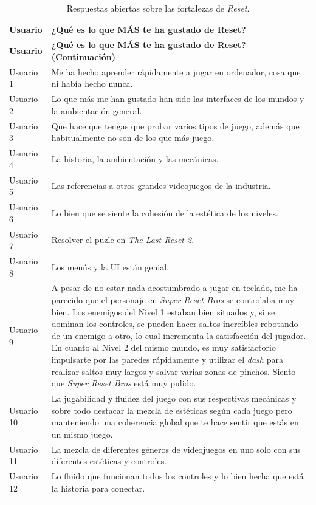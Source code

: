 \begin{longtable}{|l|p{12.5cm}|}
\hline
\textbf{Usuario} & \textbf{¿Qué es lo que MÁS te ha gustado de Reset?} \\ \hline
\endfirsthead
\hline
\textbf{Usuario} & \textbf{¿Qué es lo que MÁS te ha gustado de Reset? (Continuación)} \\ \hline
\endhead
\hline
\endfoot
\hline
\endlastfoot
Usuario 1 & Me ha hecho aprender rápidamente a jugar en ordenador, cosa que ni había hecho nunca. \\ \hline
Usuario 2 & Lo que más me han gustado han sido las interfaces de los mundos y la ambientación general. \\ \hline
Usuario 3 & Que hace que tengas que probar varios tipos de juego, además que habitualmente no son de los que más juego. \\ \hline
Usuario 4 & La historia, la ambientación y las mecánicas. \\ \hline
Usuario 5 & Las referencias a otros grandes videojuegos de la industria. \\ \hline
Usuario 6 & Lo bien que se siente la cohesión de la estética de los niveles. \\ \hline
Usuario 7 & Resolver el puzle en \textit{The Last Reset 2}. \\ \hline
Usuario 8 & Los menús y la UI están genial. \\ \hline
Usuario 9 & A pesar de no estar nada acostumbrado a jugar en teclado, me ha parecido que el personaje en \textit{Super Reset Bros} se controlaba muy bien. Los enemigos del Nivel 1 estaban bien situados y, si se dominan los controles, se pueden hacer saltos increíbles rebotando de un enemigo a otro, lo cual incrementa la satisfacción del jugador. En cuanto al Nivel 2 del mismo mundo, es muy satisfactorio impulsarte por las paredes rápidamente y utilizar el \textit{dash} para realizar saltos muy largos y salvar varias zonas de pinchos. Siento que \textit{Super Reset Bros} está muy pulido. \\ \hline
Usuario 10 & La jugabilidad y fluidez del juego con sus respectivas mecánicas y sobre todo destacar la mezcla de estéticas según cada juego pero manteniendo una coherencia global que te hace sentir que estás en un mismo juego. \\ \hline
Usuario 11 & La mezcla de diferentes géneros de videojuegos en uno solo con sus diferentes estéticas y controles. \\ \hline
Usuario 12 & Lo fluido que funcionan todos los controles y lo bien hecha que está la historia para conectar. \\ \hline
\caption{Respuestas abiertas sobre las fortalezas de \textit{Reset}.}
\label{tab:comentarios_mas_gustado}
\end{longtable}

